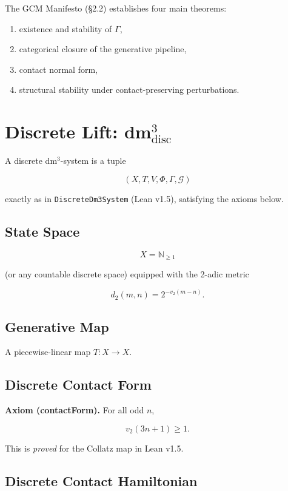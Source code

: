 \documentclass[11pt]{article}
\begin{document}
The GCM Manifesto (\S2.2) establishes four main theorems:
\begin{enumerate}
  \item existence and stability of $\Gamma$,
  \item categorical closure of the generative pipeline,
  \item contact normal form,
  \item structural stability under contact-preserving perturbations.
\end{enumerate}

\section{Discrete Lift: dm$^3_{\mathrm{disc}}$}

A discrete dm$^3$-system is a tuple


\[
(X, T, V, \Phi, \Gamma, \mathcal{G})
\]


exactly as in \texttt{DiscreteDm3System} (Lean v1.5), satisfying the axioms below.

\subsection{State Space}



\[
X = \mathbb{N}_{\ge 1}
\]


(or any countable discrete space) equipped with the 2-adic metric


\[
d_2(m,n) = 2^{-v_2(m-n)}.
\]



\subsection{Generative Map}

A piecewise-linear map $T : X \to X$.

\subsection{Discrete Contact Form}

\textbf{Axiom (contactForm).}  
For all odd $n$,


\[
v_2(3n+1) \ge 1.
\]


This is \emph{proved} for the Collatz map in Lean v1.5.

\subsection{Discrete Contact Hamiltonian}
\end{document}
